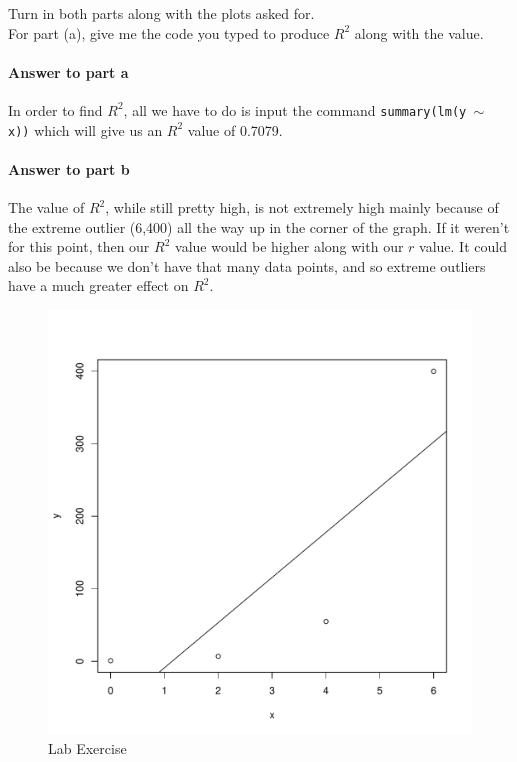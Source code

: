 \documentclass{article}
\newcommand{\code}[1]{\texttt{#1}} %
\newcommand{\p}[1]{\paragraph{#1}} %
\begin{document}
Turn in both parts along with the plots asked for. \\
For part (a), give me the code you typed to produce $R^2$ along with the value.

\p{Answer to part a}
In order to find $R^2$, all we have to do is input the command \code{summary(lm(y $\sim$ x))} which will give us an $R^2$ value of 0.7079.

\p{Answer to part b}
The value of $R^2$, while still pretty high, is not extremely high mainly because of the extreme outlier (6,400) all the way up in the corner of the graph. If it weren't for this point, then our $R^2$ value would be higher along with our $r$ value. It could also be because we don't have that many data points, and so extreme outliers have a much greater effect on $R^2$.

\begin{figure}[!htbp]
   \centering
   \includegraphics[width=5in]{img/Lab4_print_4.pdf} 
   \caption{Lab Exercise}
   \label{fig:print_4}
\end{figure}
\end{document}
